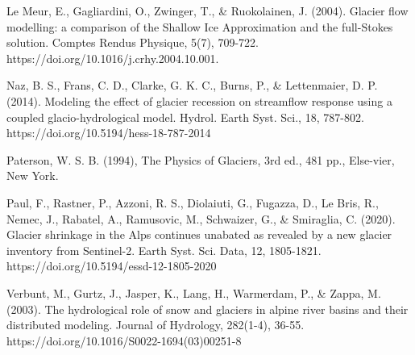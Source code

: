 \documentclass{article}
\begin{document}
\begin{thebibliography}{99}
    Le Meur, E., Gagliardini, O., Zwinger, T., \& Ruokolainen, J. (2004). Glacier flow modelling: a comparison of the Shallow Ice Approximation and the full-Stokes solution. Comptes Rendus Physique, 5(7), 709-722. https://doi.org/10.1016/j.crhy.2004.10.001. 

    Naz, B. S., Frans, C. D., Clarke, G. K. C., Burns, P., \& Lettenmaier, D. P. (2014). Modeling the effect of glacier recession on streamflow response using a coupled glacio-hydrological model. Hydrol. Earth Syst. Sci., 18, 787-802. https://doi.org/10.5194/hess-18-787-2014 

    Paterson, W. S. B. (1994), The Physics of Glaciers, 3rd ed., 481 pp., Else-vier, New York. 

    Paul, F., Rastner, P., Azzoni, R. S., Diolaiuti, G., Fugazza, D., Le Bris, R., Nemec, J., Rabatel, A., Ramusovic, M., Schwaizer, G., \& Smiraglia, C. (2020). Glacier shrinkage in the Alps continues unabated as revealed by a new glacier inventory from Sentinel-2. Earth Syst. Sci. Data, 12, 1805-1821. https://doi.org/10.5194/essd-12-1805-2020 

    Verbunt, M., Gurtz, J., Jasper, K., Lang, H., Warmerdam, P., \& Zappa, M. (2003). The hydrological role of snow and glaciers in alpine river basins and their distributed modeling. Journal of Hydrology, 282(1-4), 36-55. https://doi.org/10.1016/S0022-1694(03)00251-8 
\end{thebibliography}
    
\end{document}
